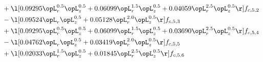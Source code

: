 \begin{alignat}{2}
& + \l[  0.09295 \opL_r^{0.5} \opL_z^{0.5} +  0.06099 \opL_r^{1.5} \opL_z^{0.5} +  0.04059 \opL_r^{2.5} \opL_z^{0.5}  \r] f_{c,5,2} \nonumber \\ 
& - \l[  0.09524 \opL_r \opL_z^{0.5} +  0.05128 \opL_r^{2.0} \opL_z^{0.5}  \r] f_{c,5,3} \nonumber \\ 
& + \l[  0.09295 \opL_r^{0.5} \opL_z^{0.5} +  0.06099 \opL_r^{1.5} \opL_z^{0.5} +  0.03690 \opL_r^{2.5} \opL_z^{0.5}  \r] f_{c,5,4} \nonumber \\ 
& - \l[  0.04762 \opL_r \opL_z^{0.5} +  0.03419 \opL_r^{2.0} \opL_z^{0.5}  \r] f_{c,5,5} \nonumber \\ 
& + \l[  0.02033 \opL_r^{1.5} \opL_z^{0.5} +  0.01845 \opL_r^{2.5} \opL_z^{0.5}  \r] f_{c,5,6} \nonumber \\ 
\end{alignat} 


